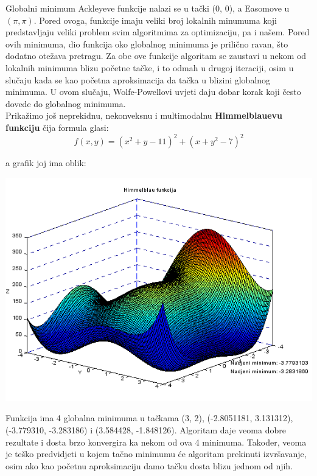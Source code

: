 \documentclass[bosnian,12pt,a4paper]{report}
\begin{document}
\justify
Globalni minimum Ackleyeve funkcije nalazi se u tački (0, 0), a Easomove u $(\pi, \pi)$. Pored ovoga, funkcije imaju veliki broj lokalnih minumuma koji predstavljaju veliki problem svim algoritmima za optimizaciju, pa i našem. Pored ovih minimuma, dio funkcija oko globalnog minimuma je prilično ravan, što dodatno otežava pretragu. Za obe ove funkcije algoritam se zaustavi u nekom od lokalnih minimuma blizu početne tačke, i to odmah u drugoj iteraciji, osim u slučaju kada se kao početna aproksimacija da tačka u blizini globalnog minimuma. U ovom slučaju, Wolfe-Powellovi uvjeti daju dobar korak koji često dovede do globalnog minimuma.\\


\justify
Prikažimo još neprekidnu, nekonveksnu i multimodalnu \textbf{Himmelblauevu funkciju} čija formula glasi:
$$ f(x, y) = (x^2 + y -11)^2 + (x + y^2 -7)^2 $$

\vspace*{1cm}

a grafik joj ima oblik:\\

\begin{center}
   \includegraphics[scale=0.7]{himmelblaufunction.png}
\end{center}

\justify
Funkcija ima 4 globalna minimuma u tačkama (3, 2), (-2.8051181, 3.131312), (-3.779310, -3.283186) i (3.584428, -1.848126). Algoritam daje veoma dobre rezultate i dosta brzo konvergira ka nekom od ova 4 minimuma. Također, veoma je teško predvidjeti u kojem tačno minimumu će algoritam prekinuti izvršavanje, osim ako kao početnu aproksimaciju damo tačku dosta blizu jednom od njih.\\
\end{document}
